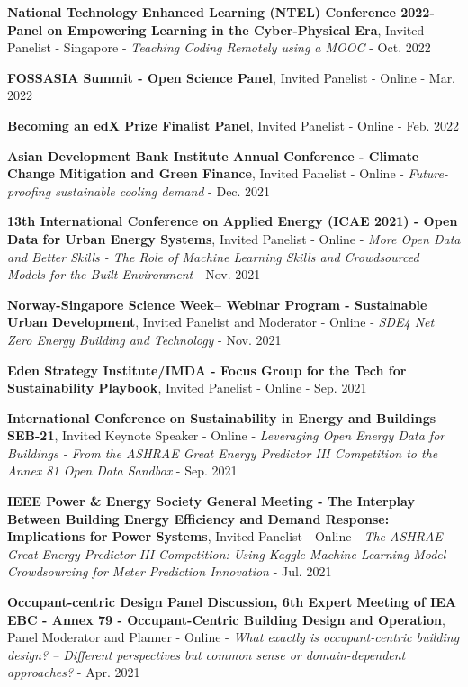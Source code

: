 \documentclass[10pt,a4paper]{article}
\begin{document}
\begin{small}
\begin{etaremune}
\item
\textbf{National Technology Enhanced Learning (NTEL) Conference 2022- Panel on Empowering Learning in the Cyber-Physical Era}, Invited Panelist - Singapore - \emph{Teaching Coding Remotely using a MOOC} - Oct. 2022
\item
\textbf{FOSSASIA Summit - Open Science Panel}, Invited Panelist - Online - Mar. 2022
\item
\textbf{Becoming an edX Prize Finalist Panel}, Invited Panelist - Online - Feb. 2022
\item
\textbf{Asian Development Bank Institute Annual Conference - Climate Change Mitigation and Green Finance}, Invited Panelist - Online - \emph{Future-proofing sustainable cooling demand} - Dec. 2021
\item
\textbf{13th International Conference on Applied Energy (ICAE 2021) - Open Data for Urban Energy Systems}, Invited Panelist - Online - \emph{More Open Data and Better Skills - The Role of Machine Learning Skills and Crowdsourced Models for the Built Environment} - Nov. 2021
\item
\textbf{Norway-Singapore Science Week– Webinar Program - Sustainable Urban Development}, Invited Panelist and Moderator - Online - \emph{SDE4 Net Zero Energy Building and Technology} - Nov. 2021
\item
\textbf{Eden Strategy Institute/IMDA - Focus Group for the Tech for Sustainability Playbook}, Invited Panelist - Online - Sep. 2021
\item
\textbf{International Conference on Sustainability in Energy and Buildings SEB-21}, Invited Keynote Speaker - Online - \emph{Leveraging Open Energy Data for Buildings - From the ASHRAE Great Energy Predictor III Competition to the Annex 81 Open Data Sandbox} - Sep. 2021
\item
\textbf{IEEE Power \& Energy Society General Meeting - The Interplay Between Building Energy Efficiency and Demand Response: Implications for Power Systems}, Invited Panelist - Online - \emph{The ASHRAE Great Energy Predictor III Competition: Using Kaggle Machine Learning Model Crowdsourcing for Meter Prediction Innovation} - Jul. 2021
\item
\textbf{Occupant-centric Design Panel Discussion, 6th Expert Meeting of IEA EBC - Annex 79 - Occupant-Centric Building Design and Operation}, Panel Moderator and Planner - Online - \emph{What exactly is occupant-centric building design? – Different perspectives but common sense or domain-dependent approaches?}  - Apr. 2021
\item

\end{etaremune}
\end{small}
\end{document}
